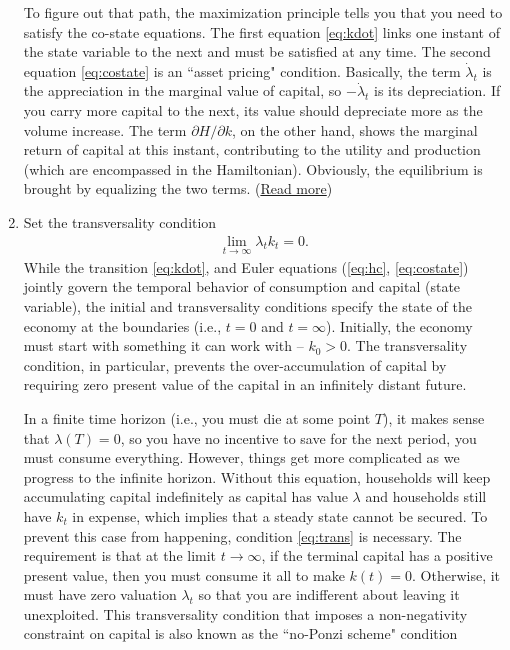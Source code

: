 \documentclass[11pt,a4paper]{book}
\theoremstyle{definition}\newtheorem{definition}{Definition}
\theoremstyle{definition}\newtheorem{fact}{Fact}
\theoremstyle{definition}\newtheorem{remark}{Remark}
\theoremstyle{definition}\newtheorem{ex}{Ex.}
\theoremstyle{definition}\newtheorem{project}{Project}
\theoremstyle{definition}\newtheorem{problem}{Problem}
\theoremstyle{definition}\newtheorem{example}{Example}
\numberwithin{theorem}{section}
\numberwithin{corollary}{chapter}
\numberwithin{assumption}{chapter}
\numberwithin{definition}{chapter}
\numberwithin{prop}{chapter}
\numberwithin{notation}{chapter}
\numberwithin{problem}{chapter}
\numberwithin{example}{chapter}
\numberwithin{fact}{chapter}
\numberwithin{ex}{chapter}
\begin{document}
\begin{enumerate}
		To figure out that path, the maximization principle tells you that you need to satisfy the co-state equations. The first equation \eqref{eq:kdot} links one instant of the state variable to the next and must be satisfied at any time. The second equation \eqref{eq:costate} is an ``asset pricing" condition. Basically, the term $\dot{\lambda}_t$ is the appreciation in the marginal value of capital, so $-\dot{\lambda}_t$ is its depreciation. If you carry more capital to the next, its value should depreciate more as the volume increase. The term $\partial H/\partial k$, on the other hand, shows the marginal return of capital at this instant, contributing to the utility and production (which are encompassed in the Hamiltonian). Obviously, the equilibrium is brought by equalizing the two terms. (\href{https://www3.nd.edu/~nmark/Climate/CurrentValueHamiltonian.pdf}{Read more})
		
		\item Set the transversality condition
		\begin{align}
			\lim_{t\to\infty} \lambda_t k_t = 0. \label{eq:trans}
		\end{align}
		While the transition \eqref{eq:kdot}, and Euler equations (\eqref{eq:hc}, \eqref{eq:costate}) jointly govern the temporal behavior of consumption and capital (state variable), the initial and transversality conditions specify the state of the economy at the boundaries (i.e., $t = 0$ and $t = \infty$). Initially, the economy must start with something it can work with -- $k_0 > 0$. The transversality condition, in particular, prevents the over-accumulation of capital by requiring zero present value of the capital in an infinitely distant future. 
		
		In a finite time horizon (i.e., you must die at some point $T$), it makes sense that $\lambda(T) = 0$, so you have no incentive to save for the next period, you must consume everything. However, things get more complicated as we progress to the infinite horizon. Without this equation, households will keep accumulating capital indefinitely as capital has value $\lambda$ and households still have $k_t$ in expense, which implies that a steady state cannot be secured. To prevent this case from happening, condition \eqref{eq:trans} is necessary. The requirement is that at the limit $t\to\infty$, if the terminal capital has a positive present value, then you must consume it all to make $k(t) = 0$. Otherwise, it must have zero valuation $\lambda_t$ so that you are indifferent about leaving it unexploited. This transversality condition that imposes a non-negativity constraint on capital is also known as the ``no-Ponzi scheme" condition
		

\end{enumerate}
\end{document}
